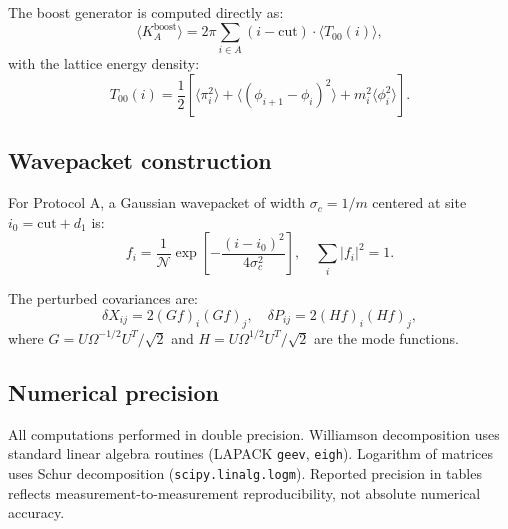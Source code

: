 \documentclass[11pt]{article}
\begin{document}
The boost generator is computed directly as:
\begin{equation}
\langle K^{\mathrm{boost}}_A\rangle = 2\pi \sum_{i \in A} (i - \mathrm{cut}) \cdot \langle T_{00}(i)\rangle,
\end{equation}
with the lattice energy density:
\begin{equation}
T_{00}(i) = \frac{1}{2}\left[\langle\pi_i^2\rangle + \langle(\phi_{i+1} - \phi_i)^2\rangle + m_i^2 \langle\phi_i^2\rangle\right].
\end{equation}

\subsection{Wavepacket construction}

For Protocol A, a Gaussian wavepacket of width $\sigma_c = 1/m$ centered at site $i_0 = \mathrm{cut} + d_1$ is:
\begin{equation}
f_i = \frac{1}{\mathcal{N}} \exp\left[-\frac{(i - i_0)^2}{4\sigma_c^2}\right], \quad \sum_i |f_i|^2 = 1.
\end{equation}

The perturbed covariances are:
\begin{equation}
\delta X_{ij} = 2 (G f)_i (G f)_j, \quad \delta P_{ij} = 2 (H f)_i (H f)_j,
\end{equation}
where $G = U \Omega^{-1/2} U^T / \sqrt{2}$ and $H = U \Omega^{1/2} U^T / \sqrt{2}$ are the mode functions.

\subsection{Numerical precision}

All computations performed in double precision. Williamson decomposition uses standard linear algebra routines (LAPACK \texttt{geev}, \texttt{eigh}). Logarithm of matrices uses Schur decomposition (\texttt{scipy.linalg.logm}). Reported precision in tables reflects measurement-to-measurement reproducibility, not absolute numerical accuracy.
\end{document}
